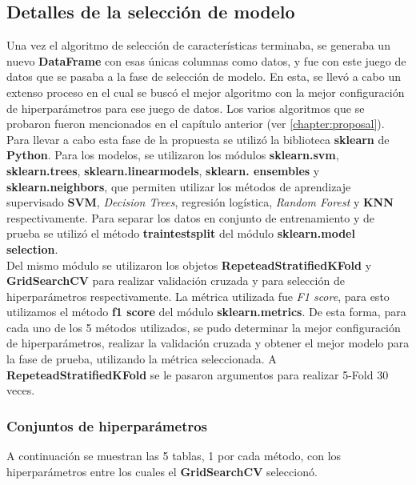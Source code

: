 	\subsection{Detalles de la selección de modelo}
		Una vez el algoritmo de selección de características terminaba, se generaba un nuevo \textbf{DataFrame} con esas únicas columnas como datos,
		y fue con este juego de datos que se pasaba a la fase de selección de modelo. En esta, se llevó a cabo un extenso proceso en el cual se buscó
		el mejor algoritmo con la mejor configuración de hiperparámetros para ese juego de datos. Los varios algoritmos que se probaron fueron
		mencionados en el capítulo anterior (ver \ref {chapter:proposal}).\\
		\indent Para llevar a cabo esta fase de la propuesta se utilizó la biblioteca \textbf{sklearn} de \textbf{Python}.
		Para los modelos, se utilizaron los módulos \textbf{sklearn.svm}, \textbf{sklearn.trees}, \textbf{sklearn.linear\textunderscore models},
		\textbf{sklearn. ensembles} y \textbf{sklearn.neighbors}, que permiten utilizar los métodos de aprendizaje supervisado \textbf{SVM}, \emph
		{Decision Trees}, regresión logística, \emph{Random Forest} y \textbf{KNN} respectivamente. Para separar los datos en conjunto de entrenamiento
		y de prueba se utilizó el método \textbf{train\textunderscore test\textunderscore split} del módulo \textbf{sklearn.model\textunderscore
		selection}.\\
		\indent Del mismo módulo se utilizaron los objetos \textbf {RepeteadStratifiedKFold} y \textbf{GridSearchCV} para realizar validación cruzada y
		para selección de hiperparámetros respectivamente. La métrica utilizada fue \emph{F1 score}, para esto utilizamos el método \textbf{f1\textunderscore
		score} del módulo \textbf{sklearn.metrics}. De esta forma, para cada uno de los 5 métodos utilizados, se pudo determinar la mejor configuración
		de hiperparámetros, realizar la validación cruzada y obtener el mejor modelo para la fase de prueba, utilizando la métrica seleccionada. A \textbf{
		RepeteadStratifiedKFold} se le pasaron argumentos para realizar 5-Fold 30 veces.

		\subsubsection{Conjuntos de hiperparámetros}
			A continuación se muestran las 5 tablas, 1 por cada método, con los hiperparámetros entre los cuales el \textbf{GridSearchCV} seleccionó.\\

